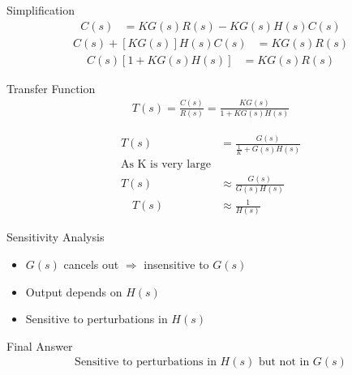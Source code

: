 \documentclass{beamer}
\begin{document}
\begin{frame}{Simplification}
\begin{align}
C(s) &= K G(s)R(s) - K G(s)H(s)C(s) 
\end{align}
\begin{align}
C(s) + [K G(s)]H(s)C(s) &= K G(s)R(s) 
\end{align}
\begin{align}
C(s)\left[1 + K G(s)H(s)\right] &= K G(s)R(s)
\end{align}
\end{frame}


\begin{frame}{Transfer Function}
\begin{align}
T(s) = \frac{C(s)}{R(s)} = \frac{K G(s)}{1 + K G(s)H(s)}
\end{align}

\begin{align}
T(s) &= \frac{G(s)}{\frac{1}{K} + G(s)H(s)} \\
\text{As K is very large}\\
T(s) &\approx\frac{G(s)}{G(s)H(s)}\\
\quad T(s) &\approx \frac{1}{H(s)}
\end{align}
\end{frame}


\begin{frame}{Sensitivity Analysis}
\begin{itemize}
    \item $G(s)$ cancels out $\Rightarrow$ insensitive to $G(s)$
    \item Output depends on $H(s)$
    \item Sensitive to perturbations in $H(s)$
\end{itemize}
\end{frame}


\begin{frame}{Final Answer}
\begin{align}
\boxed{\text{Sensitive to perturbations in } H(s)\text{ but not in } G(s)}
\end{align}
\end{frame}
\end{document}
